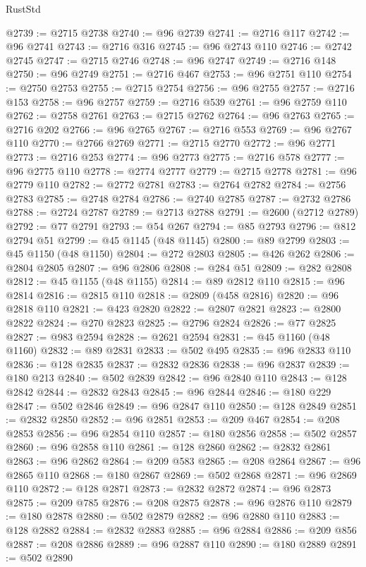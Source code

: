 \begin{lexlean}{RustStd}
\begin{coremodule}
{\begin{coremodule}
{{{{{{{{{{{{{{{{{{{{{{{{{{{{{{{{{{{{{{{{{{{{{{{{{{{{{{{{{{{{@2739 := @2715 @2738
@2740 := @96 @2739
@2741 := @2716 @117
@2742 := @96 @2741
@2743 := @2716 @316
@2745 := @96 @2743 @110
@2746 := @2742 @2745
@2747 := @2715 @2746
@2748 := @96 @2747
@2749 := @2716 @148
@2750 := @96 @2749
@2751 := @2716 @467
@2753 := @96 @2751 @110
@2754 := @2750 @2753
@2755 := @2715 @2754
@2756 := @96 @2755
@2757 := @2716 @153
@2758 := @96 @2757
@2759 := @2716 @539
@2761 := @96 @2759 @110
@2762 := @2758 @2761
@2763 := @2715 @2762
@2764 := @96 @2763
@2765 := @2716 @202
@2766 := @96 @2765
@2767 := @2716 @553
@2769 := @96 @2767 @110
@2770 := @2766 @2769
@2771 := @2715 @2770
@2772 := @96 @2771
@2773 := @2716 @253
@2774 := @96 @2773
@2775 := @2716 @578
@2777 := @96 @2775 @110
@2778 := @2774 @2777
@2779 := @2715 @2778
@2781 := @96 @2779 @110
@2782 := @2772 @2781
@2783 := @2764 @2782
@2784 := @2756 @2783
@2785 := @2748 @2784
@2786 := @2740 @2785
@2787 := @2732 @2786
@2788 := @2724 @2787
@2789 := @2713 @2788
@2791 := @2600 (@2712 @2789)
@2792 := @77 @2791
@2793 := @54 @267
@2794 := @85 @2793
@2796 := @812 @2794 @51
@2799 := @45 @1145 (@48 @1145)
@2800 := @89 @2799
@2803 := @45 @1150 (@48 @1150)
@2804 := @272 @2803
@2805 := @426 @262
@2806 := @2804 @2805
@2807 := @96 @2806
@2808 := @284 @51
@2809 := @282 @2808
@2812 := @45 @1155 (@48 @1155)
@2814 := @89 @2812 @110
@2815 := @96 @2814
@2816 := @2815 @110
@2818 := @2809 (@458 @2816)
@2820 := @96 @2818 @110
@2821 := @423 @2820
@2822 := @2807 @2821
@2823 := @2800 @2822
@2824 := @270 @2823
@2825 := @2796 @2824
@2826 := @77 @2825
@2827 := @983 @2594
@2828 := @2621 @2594
@2831 := @45 @1160 (@48 @1160)
@2832 := @89 @2831
@2833 := @502 @495
@2835 := @96 @2833 @110
@2836 := @128 @2835
@2837 := @2832 @2836
@2838 := @96 @2837
@2839 := @180 @213
@2840 := @502 @2839
@2842 := @96 @2840 @110
@2843 := @128 @2842
@2844 := @2832 @2843
@2845 := @96 @2844
@2846 := @180 @229
@2847 := @502 @2846
@2849 := @96 @2847 @110
@2850 := @128 @2849
@2851 := @2832 @2850
@2852 := @96 @2851
@2853 := @209 @467
@2854 := @208 @2853
@2856 := @96 @2854 @110
@2857 := @180 @2856
@2858 := @502 @2857
@2860 := @96 @2858 @110
@2861 := @128 @2860
@2862 := @2832 @2861
@2863 := @96 @2862
@2864 := @209 @583
@2865 := @208 @2864
@2867 := @96 @2865 @110
@2868 := @180 @2867
@2869 := @502 @2868
@2871 := @96 @2869 @110
@2872 := @128 @2871
@2873 := @2832 @2872
@2874 := @96 @2873
@2875 := @209 @785
@2876 := @208 @2875
@2878 := @96 @2876 @110
@2879 := @180 @2878
@2880 := @502 @2879
@2882 := @96 @2880 @110
@2883 := @128 @2882
@2884 := @2832 @2883
@2885 := @96 @2884
@2886 := @209 @856
@2887 := @208 @2886
@2889 := @96 @2887 @110
@2890 := @180 @2889
@2891 := @502 @2890
}}}}}}}}}}}}}}}}}}}}}}}}}}}}}}}}}}}}}}}}}}}}}}}}}}}}}}}}}}}}
\end{coremodule}}
\end{coremodule}
\end{lexlean}
